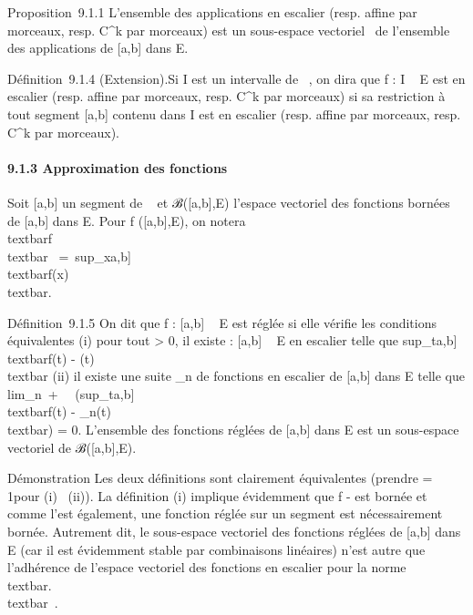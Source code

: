 \documentclass[]{article}
\begin{document}
Proposition~9.1.1 L'ensemble des applications en escalier (resp. affine
par morceaux, resp. C^k par morceaux) est un sous-espace
vectoriel ~de l'ensemble des applications de {[}a,b{]} dans E.

Définition~9.1.4 (Extension).Si I est un intervalle de ~, on dira que f
: I \rightarrow~ E est en escalier (resp. affine par morceaux, resp. C^k
par morceaux) si sa restriction à tout segment {[}a,b{]} contenu dans I
est en escalier (resp. affine par morceaux, resp. C^k par
morceaux).

\paragraph{9.1.3 Approximation des fonctions}

Soit {[}a,b{]} un segment de ~ et ℬ({[}a,b{]},E) l'espace vectoriel des
fonctions bornées de {[}a,b{]} dans E. Pour f ({[}a,b{]},E), on notera
\\textbar{}f\\textbar{}\infty~
=\
sup\_x\in{[}a,b{]}\\textbar{}f(x)\\textbar{}.

Définition~9.1.5 On dit que f : {[}a,b{]} \rightarrow~ E est réglée si elle vérifie
les conditions équivalentes (i) pour tout \epsilon \textgreater{} 0, il existe
\phi : {[}a,b{]} \rightarrow~ E en escalier telle que
sup\_t\in{[}a,b{]}~\\textbar{}f(t)
- \phi(t)\\textbar{} \leq \epsilon (ii) il existe une suite
\phi\_n de fonctions en escalier de {[}a,b{]} dans E telle que
lim\_n\rightarrow~+\infty~~\left
(sup\_t\in{[}a,b{]}~\\textbar{}f(t)
- \phi\_n(t)\\textbar{}\right ) = 0.
L'ensemble des fonctions réglées de {[}a,b{]} dans E est un sous-espace
vectoriel de ℬ({[}a,b{]},E).

Démonstration Les deux définitions sont clairement équivalentes (prendre
\epsilon = 1\diagupn pour (i) \rigtharrow~(ii)). La définition (i) implique évidemment que f - \phi
est bornée et comme \phi l'est également, une fonction réglée sur un
segment est nécessairement bornée. Autrement dit, le sous-espace
vectoriel des fonctions réglées de {[}a,b{]} dans E (car il est
évidemment stable par combinaisons linéaires) n'est autre que
l'adhérence de l'espace vectoriel des fonctions en escalier pour la
norme \\textbar{}.\\textbar{}\infty~.
\end{document}
